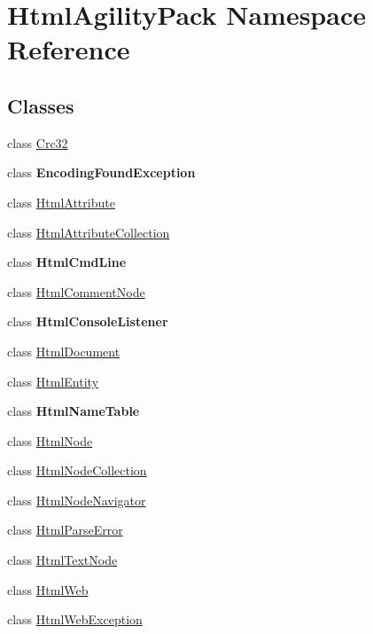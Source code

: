 \hypertarget{namespace_html_agility_pack}{}\section{Html\+Agility\+Pack Namespace Reference}
\label{namespace_html_agility_pack}
\subsection*{Classes}
\begin{DoxyCompactItemize}
\item 
class \hyperlink{class_html_agility_pack_1_1_crc32}{Crc32}
\item 
class {\bfseries Encoding\+Found\+Exception}
\item 
class \hyperlink{class_html_agility_pack_1_1_html_attribute}{Html\+Attribute}
\item 
class \hyperlink{class_html_agility_pack_1_1_html_attribute_collection}{Html\+Attribute\+Collection}
\item 
class {\bfseries Html\+Cmd\+Line}
\item 
class \hyperlink{class_html_agility_pack_1_1_html_comment_node}{Html\+Comment\+Node}
\item 
class {\bfseries Html\+Console\+Listener}
\item 
class \hyperlink{class_html_agility_pack_1_1_html_document}{Html\+Document}
\item 
class \hyperlink{class_html_agility_pack_1_1_html_entity}{Html\+Entity}
\item 
class {\bfseries Html\+Name\+Table}
\item 
class \hyperlink{class_html_agility_pack_1_1_html_node}{Html\+Node}
\item 
class \hyperlink{class_html_agility_pack_1_1_html_node_collection}{Html\+Node\+Collection}
\item 
class \hyperlink{class_html_agility_pack_1_1_html_node_navigator}{Html\+Node\+Navigator}
\item 
class \hyperlink{class_html_agility_pack_1_1_html_parse_error}{Html\+Parse\+Error}
\item 
class \hyperlink{class_html_agility_pack_1_1_html_text_node}{Html\+Text\+Node}
\item 
class \hyperlink{class_html_agility_pack_1_1_html_web}{Html\+Web}
\item 
class \hyperlink{class_html_agility_pack_1_1_html_web_exception}{Html\+Web\+Exception}
\item 

\end{DoxyCompactItemize}
